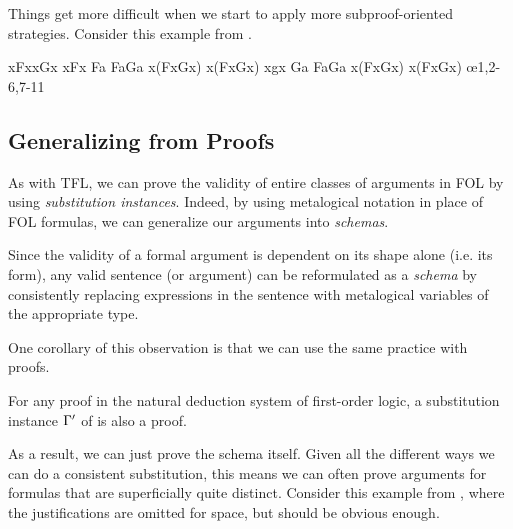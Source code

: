 Things get more difficult when we start to apply more subproof-oriented
strategies. Consider this example from \cite[][p. 308]{Smi20}.

\begin{fitchproof}
   {\eexists xFx\eor\exists xGx} 
  \open
   {\eexists xFx}                
  \open
   {Fa}                          
   {Fa\eor Ga}                   
   {\eexists x(Fx\eor Gx)}       
  \close
   {\eexists x(Fx\eor Gx)}       
  \close
  \open
   {\eexists xgx}                
  \open
   {Ga}                          
   {Fa\eor Ga}                   
         
  \close
   {\eexists x(Fx\eor Gx)}      
  \close
   {\eexists x(Fx\eor Gx)}      \oe{1,2-6,7-11}
\end{fitchproof}

\subsection{Generalizing from Proofs}

As with TFL, we can prove the validity of entire classes of arguments in FOL
by using \emph{substitution instances}. Indeed, by using metalogical notation in
place of FOL formulas, we can generalize our arguments into \emph{schemas}.

\begin{observation}
  Since the validity of a formal argument is dependent on its shape alone (i.e.
  its form), any valid sentence (or argument) can be reformulated as a
  \emph{schema} by consistently replacing expressions in the sentence with
  metalogical variables of the appropriate type.
\end{observation}

One corollary of this observation is that we can use the same practice with
proofs.

\begin{observation}
  For any proof \eGamma in the natural deduction system of first-order logic, a
  substitution instance $\Gamma'$ of \eGamma is also a proof.
\end{observation}

As a result, we can just prove the schema itself. Given all the different ways
we can do a consistent substitution, this means we can often prove arguments for
formulas that are superficially quite distinct. Consider this example from
\cite{Smi20}, where the justifications are omitted for space, but should be
obvious enough.

